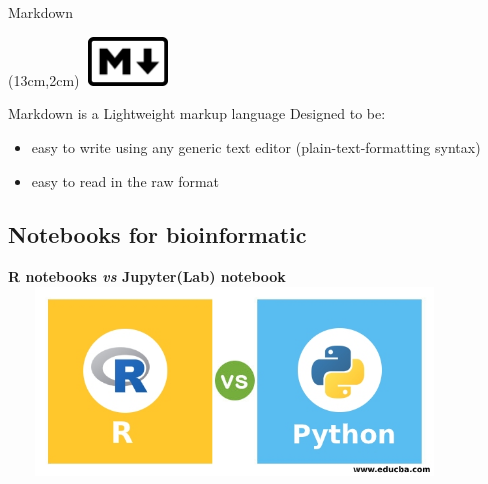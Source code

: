 \begin{frame}{Markdown}
\begin{textblock*}{5cm}(13cm,2cm) %
\includegraphics[width=2.3cm,height=1.3cm]{images/Markdown-mark.pdf}
\end{textblock*}
Markdown is a Lightweight markup language
\newline
Designed to be:
\pause
\begin{itemize}[<+->]
	\item easy to write using any generic text editor (plain-text-formatting syntax)
	\item easy to read in the raw format
\end{itemize}
\end{frame}

\subsection*{Notebooks for bioinformatic}
\begin{frame}
\centering\textbf{R notebooks \emph{vs} Jupyter(Lab) notebook}
\newline
\includegraphics[width=12cm,height=5cm]{images/R-vs-Python.jpg}
\end{frame}

